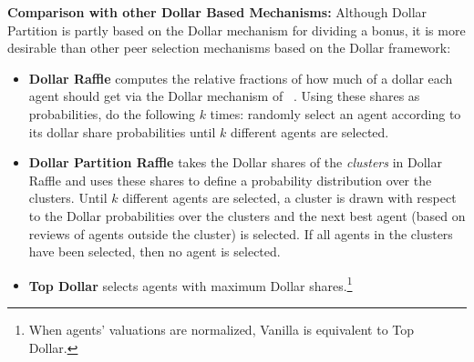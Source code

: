 \documentclass[letterpaper]{article}
\newcommand{\haris}[1]{\textcolor{green}{\textbf{Haris Says: #1}}}
\newcommand{\citet}[1]{\citeauthor{#1}~\shortcite{#1}}
\begin{document}
%
%
%
%

\smallskip
\noindent
\textbf{Comparison with other Dollar Based Mechanisms:}\;
Although Dollar Partition is partly based on the Dollar mechanism for dividing a bonus, it is more desirable than other peer selection mechanisms based on the Dollar framework:
\begin{itemize}[leftmargin=*]
	\setlength\itemsep{0em}
\item \textbf{Dollar Raffle} computes the relative fractions of how much of a dollar each agent should get via the Dollar mechanism of \citet{CMT08a}. Using these shares as probabilities, do the following $k$ times: randomly select an agent according to its dollar share probabilities until $k$ different agents are selected.
\item \textbf{Dollar Partition Raffle} takes the Dollar shares of the \emph{clusters} in Dollar Raffle and uses these shares to define a probability distribution over the clusters. Until $k$ different agents are selected, a cluster is drawn with respect to the Dollar probabilities over the clusters and the next best agent (based on reviews of agents outside the cluster) is selected. If all agents in the clusters have been selected, then no agent is selected. 
\item \textbf{Top Dollar} selects agents with maximum Dollar shares.\footnote{When agents' valuations are normalized, Vanilla is equivalent to Top Dollar.}
\end{itemize}
\end{document}
